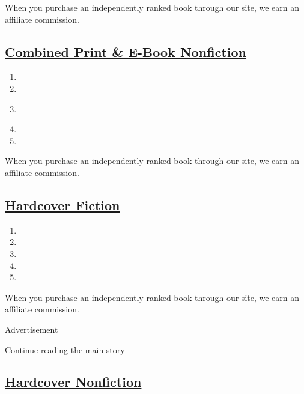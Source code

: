 When you purchase an independently ranked book through our site, we earn
an affiliate commission.

\hypertarget{combined-print--e-book-nonfiction}{%
\subsection{\texorpdfstring{\href{/books/best-sellers/2020/08/02/combined-print-and-e-book-nonfiction/}{Combined
Print \& E-Book
Nonfiction}}{Combined Print \& E-Book Nonfiction}}\label{combined-print--e-book-nonfiction}}

\begin{enumerate}
\def\labelenumi{\arabic{enumi}.}
\tightlist
\item
\item
\item
  \href{https://www.nytimes3xbfgragh.onion/2019/08/20/books/review/how-to-be-an-antiracist-ibram-x-kendi.html}{}
\item
\item
\end{enumerate}

When you purchase an independently ranked book through our site, we earn
an affiliate commission.

\hypertarget{hardcover-fiction}{%
\subsection{\texorpdfstring{\href{/books/best-sellers/2020/08/02/hardcover-fiction/}{Hardcover
Fiction}}{Hardcover Fiction}}\label{hardcover-fiction}}

\begin{enumerate}
\def\labelenumi{\arabic{enumi}.}
\tightlist
\item
\item
\item
\item
\item
\end{enumerate}

When you purchase an independently ranked book through our site, we earn
an affiliate commission.

Advertisement

\protect\hyperlink{after-mid1}{Continue reading the main story}

\hypertarget{hardcover-nonfiction}{%
\subsection{\texorpdfstring{\href{/books/best-sellers/2020/08/02/hardcover-nonfiction/}{Hardcover
Nonfiction}}{Hardcover Nonfiction}}\label{hardcover-nonfiction}}

